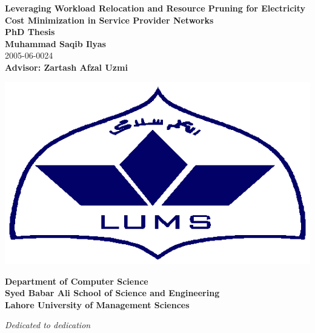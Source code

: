 \newpage
\thispagestyle{empty}
\begin{center}
  \vspace*{0.2in}
  {\LARGE \bf Leveraging Workload Relocation and Resource Pruning for Electricity Cost Minimization in Service Provider Networks}\\
  \vspace*{0.5in}
  {\Large \bf PhD Thesis}\\

  \vspace*{0.4in}
  {\Large\bf Muhammad Saqib Ilyas}\\
    \vspace*{0.2in}
  {\Large 2005-06-0024}\\
  \vspace*{0.4in}
  {\Large\bf Advisor: Zartash Afzal Uzmi}\\

	\vspace*{0.4in}
  \begin{center}
   \includegraphics[scale = 0.5]{./pics/lums.eps}
  \end{center}
  \vspace*{0.4in}  
  {\Large\bf Department of Computer Science} \\
  \vspace*{0.2in}
  {\Large\bf Syed Babar Ali School of Science and Engineering} \\
  \vspace*{0.2in}
  {\Large \bf Lahore University of Management Sciences}
  
  
\end{center}
\newpage
\thispagestyle{empty}
\begin{center}
 \vspace*{3in}
  \textit{\LARGE {Dedicated to dedication}}\\

\end{center}

